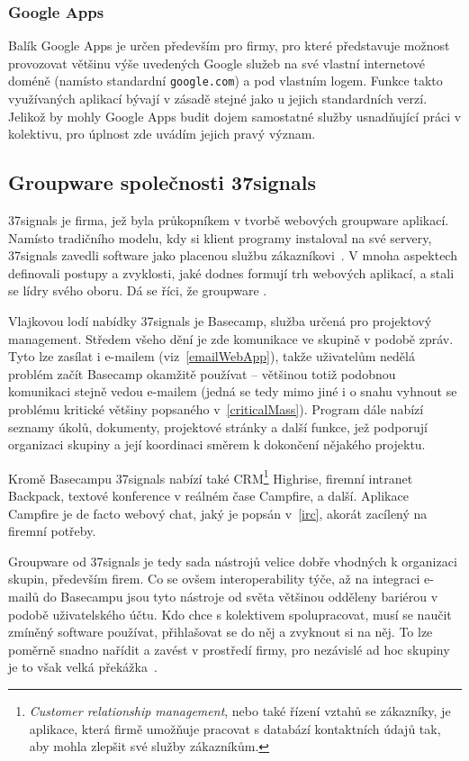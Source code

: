 \documentclass[12pt,oneside,final]{fithesis2}
\begin{document}
\subsubsection*{Google Apps}\label{googleApps}
Balík Google Apps je určen především pro firmy, pro které představuje možnost provozovat většinu výše uvedených Google služeb na své vlastní internetové doméně (namísto standardní {\tt google.com}) a pod vlastním logem. Funkce takto využívaných aplikací bývají v zásadě stejné jako u jejich standardních verzí. Jelikož by mohly Google Apps budit dojem samostatné služby usnadňující práci v kolektivu, pro úplnost zde uvádím jejich pravý význam.

\subsection{Groupware společnosti 37signals}\label{37signals}
37signals je firma, jež byla průkopníkem v tvorbě webových groupware aplikací. Namísto tradičního modelu, kdy si klient programy instaloval na své servery, 37signals zavedli software jako placenou službu zákazníkovi~\cite{37signals2008getting}. V mnoha aspektech definovali postupy a zvyklosti, jaké dodnes formují trh webových aplikací, a stali se lídry svého oboru. Dá se říci, že groupware .

Vlajkovou lodí nabídky 37signals je Basecamp, služba určená pro projektový management. Středem všeho dění je zde komunikace ve skupině v podobě zpráv. Tyto lze zasílat i e-mailem (viz~\ref{emailWebApp}), takže uživatelům nedělá problém začít Basecamp okamžitě používat -- většinou totiž podobnou komunikaci stejně vedou e-mailem (jedná se tedy mimo jiné i o snahu vyhnout se problému kritické většiny popsaného v~\ref{criticalMass}). Program dále nabízí seznamy úkolů, dokumenty, projektové stránky a další funkce, jež podporují organizaci skupiny a její koordinaci směrem k dokončení nějakého projektu.

Kromě Basecampu 37signals nabízí také CRM\footnote{\emph{Customer relationship management}, nebo také řízení vztahů se zákazníky, je aplikace, která firmě umožňuje pracovat s databází kontaktních údajů tak, aby mohla zlepšit své služby zákazníkům.} Highrise, firemní intranet Backpack, textové konference v reálném čase Campfire, a další. Aplikace Campfire je de facto webový chat, jaký je popsán v~\ref{irc}, akorát zacílený na firemní potřeby.

Groupware od 37signals je tedy sada nástrojů velice dobře vhodných k organizaci skupin, především firem. Co se ovšem interoperability týče, až na integraci e-mailů do Basecampu jsou tyto nástroje od světa většinou odděleny bariérou v podobě uživatelského účtu. Kdo chce s kolektivem spolupracovat, musí se naučit zmíněný software používat, přihlašovat se do něj a zvyknout si na něj. To lze poměrně snadno nařídit a zavést v prostředí firmy, pro nezávislé ad hoc skupiny je to však velká překážka~\cite{grudin1994groupware}.
\end{document}

